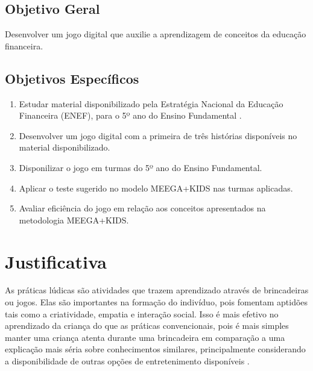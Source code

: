         \subsection{Objetivo Geral}

            Desenvolver um jogo digital que auxilie a aprendizagem de conceitos da educação financeira.

        \subsection{Objetivos Específicos}

            \begin{enumerate}[noitemsep,nosep,labelindent=\parindent,leftmargin=*,label={\alph*}) ]

                \item Estudar material disponibilizado pela Estratégia Nacional da Educação Financeira (ENEF), para o 5º
                        ano do Ensino Fundamental \cite{Educacao_financeira_nas_escolas}.

                \item Desenvolver um jogo digital com a primeira de três histórias disponíveis no material disponibilizado.

                \item Disponilizar o jogo em turmas do 5º ano do Ensino Fundamental.

                \item Aplicar o teste sugerido no modelo MEEGA+KIDS \cite{MEEGA+KIDS} nas turmas aplicadas.

                \item Avaliar eficiência do jogo em relação aos conceitos apresentados na metodologia MEEGA+KIDS.

            \end{enumerate}

    \section{Justificativa}

    As práticas lúdicas são atividades que trazem aprendizado através de brincadeiras ou jogos. Elas são importantes na
    formação do indivíduo, pois fomentam aptidões tais como a criatividade, empatia e interação social. Isso é mais
    efetivo no aprendizado da criança do que as práticas convencionais, pois é mais simples manter uma criança atenta
    durante uma brincadeira em comparação a uma explicação mais séria sobre conhecimentos similares, principalmente
    considerando a disponibilidade de outras opções de entretenimento disponíveis \cite{Santos_Thayna_da_silva_2021}.

